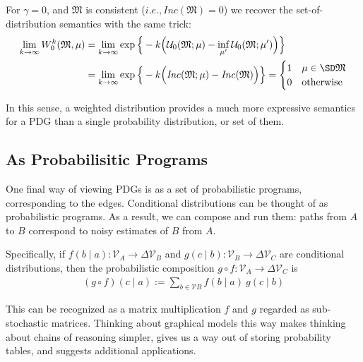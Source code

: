 \documentclass{article}
\theoremstyle{plain}
\theoremstyle{definition}
\theoremstyle{remark}
\newcommand{\note}[1]{{\color{blue}\ \!\Large\smash{\textbf{[}}{\normalsize\textsc{note:} #1}\ \!\smash{\textbf{]}}}}
\newcommand{\dg}[1]{\mathfrak{#1}}
\newcommand\inco{\mathit{Inc}}
\numberwithin{equation}{section}
\begin{document}
{	For $\gamma = 0$, and $\dg M$ is consistent ($i.e., \inco(\dg M) = 0$) we recover the set-of-distribution semantics with the same trick:
	\begin{align*}
		 \lim_{k \to \infty} W_0^k(\dg M, \mu)
		&= \lim_{k \to \infty} \exp\Big\{-k \Big(\mathcal U_0(\dg M;\mu) - \inf_{\mu'} \mathcal U_0(\dg M; \mu')\Big) \Big\} \\
		&= \lim_{k \to \infty} \exp\Big\{-k \Big(\inco(\dg M;\mu) - \inco(\dg M)\Big) \Big\} 
		= \begin{cases}
			1 & \mu \in \SD\dg M \\
			0 & \text{otherwise}
		\end{cases} 
	\end{align*}

	In this sense, a weighted distribution provides a much more expressive semantics for a PDG than a single probability distribution, or set of them.

	\begin{vleftovers}
	\subsection{As Probabilisitic Programs}\label{sec:prog-semantics}
	
	One final way of viewing PDGs is as a set of probabilistic programs, corresponding to the edges. 
	Conditional distributions can be thought of as probabilistic programs. As a result, we can compose and run them: paths from $A$ to $B$ correspond to noisy estimates of $B$ from $A$.
	
	Specifically, if $f(b \mid a) : \mathcal V_A \to \Delta \mathcal V_B$ and $g(c \mid b) : \mathcal V_B \to \Delta \mathcal V_C$ are conditional distributions, then the probabilistic composition $g\circ f : \mathcal V_A \to \Delta\mathcal V_C$ is
	\begin{align*}
		(g\circ  f) (c \mid a) :=  \sum_{b \in \mathcal V B}\!\! f (b \mid a)\ g(c \mid b)
	\end{align*}
	
	This can be recognized as a matrix multiplication $f$ and $g$ regarded as sub-stochastic matrices.
	Thinking about graphical models this way makes thinking about chains of reasoning simpler, gives us a way out of storing probability tables, and suggests additional applications.
	

\end{vleftovers}}
\end{document}
